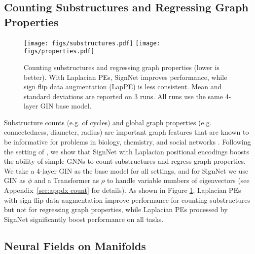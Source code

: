 \documentclass{article} \usepackage{iclr2023_conference,times}
\begin{document}
\subsection{Counting Substructures and Regressing Graph Properties}\label{sec:count_substruct}


\begin{figure}[ht]
    \centering
    \texttt{[image: figs/substructures.pdf]} \hspace{10pt}
     \texttt{[image: figs/properties.pdf]}
    \caption{Counting substructures and regressing graph properties (lower is better). With Laplacian PEs, SignNet improves performance, while sign flip data augmentation (LapPE) is less consistent. 
    Mean and standard deviations are reported on 3 runs. All runs use the same 4-layer GIN base model. 
    }
    \label{fig:counting_sub}
    \vspace{-5pt}
\end{figure}



Substructure counts (e.g. of cycles) and global graph properties (e.g. connectedness, diameter, radius) are important graph features that are known to be informative for problems in biology, chemistry, and social networks \citep{chen2020can,holland1977method}. Following the setting of \citet{zhao2022from}, we show that SignNet with Laplacian positional encodings boosts the ability of simple GNNs to count substructures and regress graph properties. We take a 4-layer GIN as the base model for all settings, and for SignNet we use GIN as $\phi$ and a Transformer as $\rho$ to handle variable numbers of eigenvectors (see Appendix~\ref{sec:appdx count} for details). As shown in Figure \ref{fig:counting_sub}, Laplacian PEs with sign-flip data augmentation improve performance for counting substructures but not for regressing graph properties, while Laplacian PEs processed by SignNet significantly boost performance on all tasks. 

\subsection{Neural Fields on Manifolds}
\end{document}
